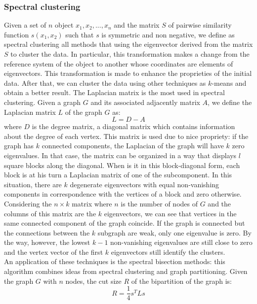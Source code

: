 \subsubsection{Spectral clustering}
Given a set of $n$ object $x_1 ,x_2, ..., x_n$ and the matrix $S$ of pairwise similarity function $s(x_1, x_2)$ such that $s$ is symmetric and non negative, we define as spectral clustering all methods that using the eigenvector derived from the matrix $S$ to cluster the data.
In particular, this transformation makes a change from the reference system of the object to another whose coordinates are elements of eigenvectors. This transformation is made to enhance the proprieties of the initial data.  After that, we can cluster the data using other techniques as $k$-means and obtain a better result. The Laplacian matrix is the most used in spectral clustering. Given a graph $G$ and its associated adjacently matrix $A$, we define the Laplacian matrix $L$ of the graph $G$ as:
\begin{equation}
L = D - A 
\end{equation}
where $D$ is the degree matrix, a diagonal matrix which contains information about the degree of each vertex. This matrix is used due to nice propriety: if the graph has $k$ connected components, the Laplacian of the graph will have $k$ zero eigenvalues.
In that case, the matrix can be organized in a way that displays $l$ square blocks along
the diagonal. When is it in this block-diagonal form, each block is at his turn a Laplacian matrix of one of the subcomponent.
In this situation,
there are $k$ degenerate eigenvectors with equal non-vanishing components in correspondence with the vertices of a block and zero otherwise. 
Considering the $n\times k$ matrix where $n$ is the number of nodes of $G$ and the columns of this matrix are the $k$ eigenvectors, we can see that vertices in the same connected component of the graph coincide.
If the graph is connected but the connections between the $k$ subgraph are weak, only one eigenvalue is zero. By the way, however, the lowest $k - 1$ non-vanishing eigenvalues are still close to zero and the vertex vector of the first $k$ eigenvectors still identify the clusters.\\
An application of these techniques is the spectral bisection methods: this algorithm combines ideas from spectral clustering and graph partitioning. 
Given the graph $G$ with $n$ nodes, the cut size $R$ of the bipartition of the graph is:
\begin{equation}\label{spec_bi_pa}
R = \frac{1}{4} s^TLs
\end{equation} 
